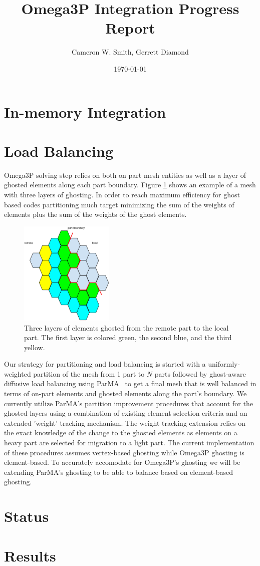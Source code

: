 \documentclass[a4paper]{article}
\title{Omega3P Integration Progress Report}
\author{Cameron W. Smith, Gerrett Diamond}
\date{\today}
\begin{document}
\maketitle

\section{In-memory Integration}



\section{Load Balancing}

Omega3P solving step relies on both on part mesh entities as well as a layer of 
ghosted elements along each part boundary. Figure \ref{fig:ghost3} shows an 
example of a mesh with three layers of ghosting. In order to reach maximum efficiency
for ghost based codes partitioning much target minimizing the sum of the 
weights of elements plus the sum of the weights of the ghost elements. 

\begin{figure}[ht]
\centering
\includegraphics[width=0.4\textwidth]{ghostingExample.eps} 
\caption{\label{fig:ghost3} Three layers of elements ghosted from the remote part to the local part.  The first layer is colored green, the second blue, and the third yellow.}
\end{figure}

\noindent Our strategy for partitioning and load balancing is started with a uniformly-weighted 
partition of the mesh from 1 part to $N$ parts followed by ghost-aware diffusive load 
balancing using ParMA~\cite{SmithParma2015} to get a final mesh that is well balanced 
in terms of on-part elements and ghosted elements along the part's boundary. We 
currently utilize ParMA's partition improvement procedures that account for the 
ghosted layers using a combination of existing element selection criteria and an 
extended 'weight' tracking mechanism.  The weight tracking extension relies on the 
exact knowledge of the change to the ghosted elements as elements on a heavy part 
are selected for migration to a light part. The current implementation of these 
procedures assumes vertex-based ghosting while Omega3P ghosting is element-based. 
To accurately accomodate for Omega3P's ghosting we will be extending ParMA's 
ghosting to be able to balance based on element-based ghosting.

\section{Status}

\section{Results}


\newpage


\end{document}
